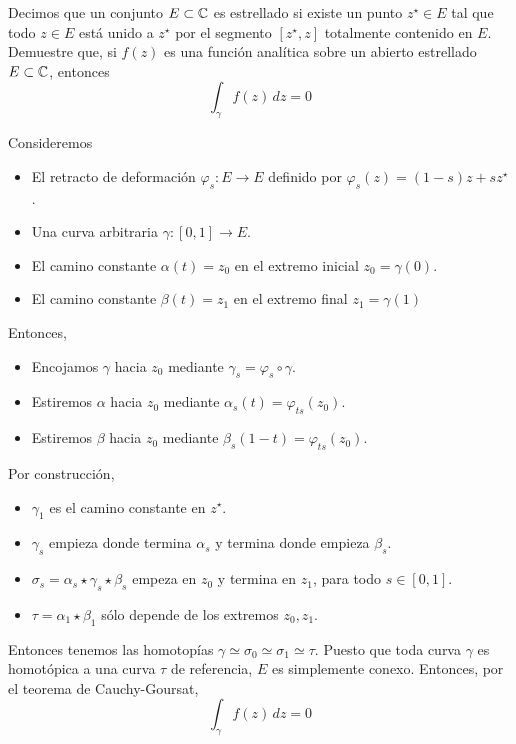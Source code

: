 \begin{exercise}
Decimos que un conjunto $E \subset \mathbb C$ es estrellado si existe un punto $z^\star \in E$ tal que todo $z \in E$ está unido a $z^\star$ por el segmento $[z^\star, z]$ totalmente contenido en $E$. Demuestre que, si $f(z)$ es una función analítica sobre un abierto estrellado $E \subset \mathbb C$, entonces
$$\int_\gamma f(z) \, dz = 0$$
\end{exercise}

\begin{solution}
Consideremos
\begin{itemize}
    \item El retracto de deformación $\varphi_s : E \to E$ definido por $\varphi_s(z) = (1-s)z + sz^\star$.
    \item Una curva arbitraria $\gamma : [0,1] \to E$.
    \item El camino constante $\alpha(t) = z_0$ en el extremo inicial $z_0 = \gamma(0)$.
    \item El camino constante $\beta(t) = z_1$ en el extremo final $z_1 = \gamma(1)$
\end{itemize}
Entonces,
\begin{itemize}
    \item Encojamos $\gamma$ hacia $z_0$ mediante $\gamma_s = \varphi_s \circ \gamma$.
    \item Estiremos $\alpha$ hacia $z_0$ mediante $\alpha_s(t) = \varphi_{ts}(z_0)$.
    \item Estiremos $\beta$ hacia $z_0$ mediante $\beta_s(1-t) = \varphi_{ts}(z_0)$.
\end{itemize}
Por construcción,
\begin{itemize}
    \item $\gamma_1$ es el camino constante en $z^\star$.
    \item $\gamma_s$ empieza donde termina $\alpha_s$ y termina donde empieza $\beta_s$.
    \item $\sigma_s = \alpha_s \star \gamma_s \star \beta_s$ empeza en $z_0$ y termina en $z_1$, para todo $s \in [0,1]$.
    \item $\tau = \alpha_1 \star \beta_1$ sólo depende de los extremos $z_0, z_1$.
\end{itemize}
Entonces tenemos las homotopías $\gamma \simeq \sigma_0 \simeq \sigma_1 \simeq \tau$. Puesto que toda curva $\gamma$ es homotópica a una curva $\tau$ de referencia, $E$ es simplemente conexo. Entonces, por el teorema de Cauchy-Goursat,
$$\int_\gamma f(z) \, dz = 0$$
\end{solution}
